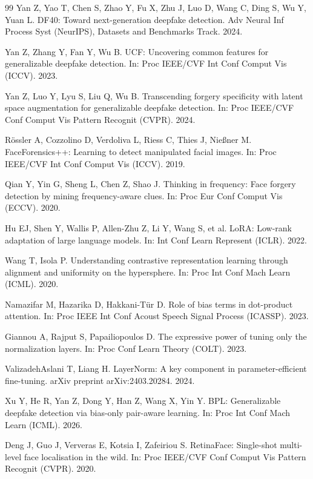 \begin{thebibliography}{99}
Yan Z, Yao T, Chen S, Zhao Y, Fu X, Zhu J, Luo D, Wang C, Ding S, Wu Y, Yuan L.
DF40: Toward next-generation deepfake detection.
Adv Neural Inf Process Syst (NeurIPS), Datasets and Benchmarks Track. 2024.

Yan Z, Zhang Y, Fan Y, Wu B.
UCF: Uncovering common features for generalizable deepfake detection.
In: Proc IEEE/CVF Int Conf Comput Vis (ICCV). 2023.

Yan Z, Luo Y, Lyu S, Liu Q, Wu B.
Transcending forgery specificity with latent space augmentation for generalizable deepfake detection.
In: Proc IEEE/CVF Conf Comput Vis Pattern Recognit (CVPR). 2024.

R{\"o}ssler A, Cozzolino D, Verdoliva L, Riess C, Thies J, Nie{\ss}ner M.
FaceForensics++: Learning to detect manipulated facial images.
In: Proc IEEE/CVF Int Conf Comput Vis (ICCV). 2019.

Qian Y, Yin G, Sheng L, Chen Z, Shao J.
Thinking in frequency: Face forgery detection by mining frequency-aware clues.
In: Proc Eur Conf Comput Vis (ECCV). 2020.

Hu EJ, Shen Y, Wallis P, Allen-Zhu Z, Li Y, Wang S, et al.
LoRA: Low-rank adaptation of large language models.
In: Int Conf Learn Represent (ICLR). 2022.

Wang T, Isola P.
Understanding contrastive representation learning through alignment and uniformity on the hypersphere.
In: Proc Int Conf Mach Learn (ICML). 2020.

Namazifar M, Hazarika D, Hakkani-T{\"u}r D.
Role of bias terms in dot-product attention.
In: Proc IEEE Int Conf Acoust Speech Signal Process (ICASSP). 2023.

Giannou A, Rajput S, Papailiopoulos D.
The expressive power of tuning only the normalization layers.
In: Proc Conf Learn Theory (COLT). 2023.

ValizadehAslani T, Liang H.
LayerNorm: A key component in parameter-efficient fine-tuning.
arXiv preprint arXiv:2403.20284. 2024.

Xu Y, He R, Yan Z, Dong Y, Han Z, Wang X, Yin Y.
BPL: Generalizable deepfake detection via bias-only pair-aware learning.
In: Proc Int Conf Mach Learn (ICML). 2026.

Deng J, Guo J, Ververas E, Kotsia I, Zafeiriou S.
RetinaFace: Single-shot multi-level face localisation in the wild.
In: Proc IEEE/CVF Conf Comput Vis Pattern Recognit (CVPR). 2020.


\end{thebibliography}
